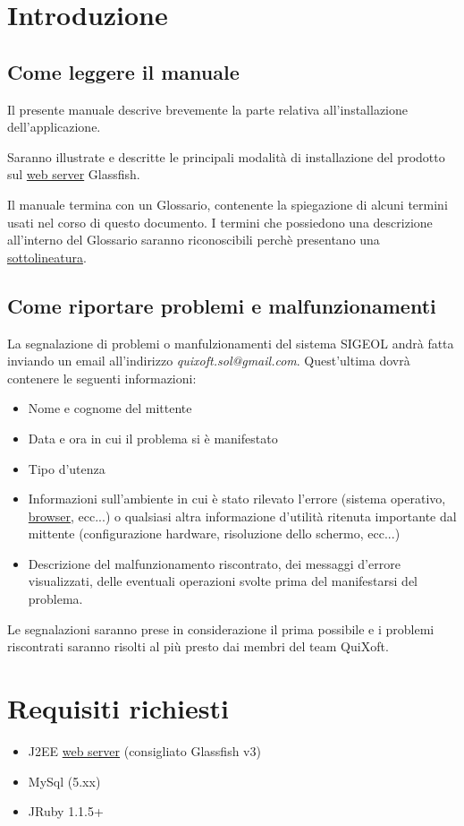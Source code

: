 \documentclass[11pt,a4paper]{article}
\begin{document}
\section{Introduzione}
\subsection{Come leggere il manuale}
Il presente manuale descrive brevemente la parte relativa all'installazione dell'applicazione.

Saranno illustrate e descritte le principali modalità di installazione del prodotto sul \underline{web server} Glassfish.

Il manuale termina con un Glossario, contenente la spiegazione di alcuni termini usati nel corso di questo documento.
I termini che possiedono una descrizione all'interno del Glossario saranno riconoscibili perchè presentano una \underline{sottolineatura}.

\subsection{Come riportare problemi e malfunzionamenti}
La segnalazione di problemi o manfulzionamenti del sistema SIGEOL andrà fatta inviando un email all'indirizzo \textit{quixoft.sol@gmail.com}.
Quest'ultima dovrà contenere le seguenti informazioni:
\begin{itemize}
 \item Nome e cognome del mittente
 \item Data e ora in cui il problema si è manifestato
 \item Tipo d'utenza
 \item Informazioni sull'ambiente in cui è stato rilevato l'errore (sistema operativo, \underline{browser}, ecc...) o qualsiasi altra informazione d'utilità ritenuta importante dal mittente (configurazione hardware, risoluzione dello schermo, ecc...)
 \item Descrizione del malfunzionamento riscontrato, dei messaggi d'errore visualizzati, delle eventuali operazioni svolte prima del manifestarsi del problema.
\end{itemize}
Le segnalazioni saranno prese in considerazione il prima possibile e i problemi riscontrati saranno risolti al più presto dai membri del team QuiXoft.
\section{Requisiti richiesti}
\begin{itemize}
 \item J2EE \underline{web server} (consigliato Glassfish v3)
 \item MySql (5.xx)
 \item JRuby 1.1.5+ 
\end{itemize}
\bigskip
\end{document}
